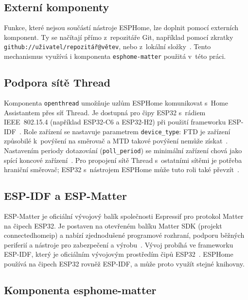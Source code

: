 \subsection{Externí komponenty}

Funkce, které nejsou součástí nástroje ESPHome, lze doplnit pomocí externích
komponent. Ty se načítají přímo z~repozitáře Git, například pomocí zkratky
\texttt{github://uživatel/repozitář@větev}, nebo z~lokální složky~\cite{esphome-external-components}.
Tento mechanismus využívá i komponenta \texttt{esphome-matter} použitá v~této
práci.

\subsection{Podpora sítě Thread}

Komponenta \texttt{openthread} umožňuje uzlům ESPHome komunikovat s~Home
Assistantem přes síť Thread. Je dostupná pro čipy ESP32 s~rádiem IEEE~802.15.4
(například ESP32-C6 a ESP32-H2) při použití frameworku ESP-IDF~\cite{esphome-openthread}.
Role zařízení se nastavuje parametrem \texttt{device\_type}: FTD je zařízení
způsobilé k~povýšení na směrovač a MTD takové povýšení nemůže
získat~\cite{esphome-openthread}. Nastavením periody dotazování (\texttt{poll\_period})
se minimální zařízení chová jako spící koncové zařízení~\cite{esphome-openthread}.
Pro propojení sítě Thread s~ostatními sítěmi je potřeba hraniční směrovač;
ESP32 s~nástrojem ESPHome může tuto roli také převzít~\cite{esphome-openthread}.

\subsection{ESP-IDF a ESP-Matter}

ESP-Matter je oficiální vývojový balík společnosti Espressif pro protokol
Matter na čipech ESP32. Je postaven na otevřeném balíku Matter SDK
(projekt connectedhomeip) a nabízí zjednodušené programové rozhraní,
podporu běžných periferií a nástroje pro zabezpečení a výrobu~\cite{espressif-esp-matter}.
Vývoj probíhá ve frameworku ESP-IDF, který je oficiálním vývojovým
prostředím čipů ESP32~\cite{espressif-esp-matter}. ESPHome používá na čipech ESP32
rovněž ESP-IDF, a může proto využít stejné knihovny.

\subsection{Komponenta esphome-matter}

